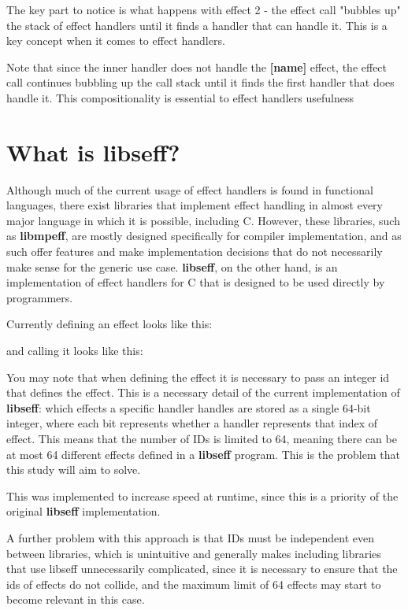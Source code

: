 \documentclass[logo,bsc,singlespacing,parskip,online]{infthesis}
\begin{document}
The key part to notice is what happens with effect 2 - the effect call "bubbles up" the stack of effect handlers until it finds a handler that can handle it. This is a key concept when it comes to effect handlers.

Note that since the inner handler does not handle the \textbf{[name]} effect, the effect call continues bubbling up the call stack until it finds the first handler that does handle it. This compositionality is essential to effect handlers usefulness %







\section{What is libseff?}

Although much of the current usage of effect handlers is found in functional languages, there exist libraries that implement effect handling in almost every major language in which it is possible, including C. However, these libraries, such as \textbf{libmpeff}, are mostly designed specifically for compiler implementation, and as such offer features and make implementation decisions that do not necessarily make sense for the generic use case.\cite{libmprompt} \textbf{libseff}, on the other hand, is an implementation of effect handlers for C that is designed to be used directly by programmers.\cite{libseff_paper}

Currently defining an effect looks like this: %

and calling it looks like this: %

You may note that when defining the effect it is necessary to pass an integer id that defines the effect. This is a necessary detail of the current implementation of \textbf{libseff}: which effects a specific handler handles are stored as a single 64-bit integer, where each bit represents whether a handler represents that index of effect. This means that the number of IDs is limited to 64, meaning there can be at most 64 different  effects defined in a \textbf{libseff} program. This is the problem that this study will aim to solve.

This was implemented to increase speed at runtime, since this is a priority of the original \textbf{libseff} implementation. %

A further problem with this approach is that IDs must be independent even between libraries, which is unintuitive and generally makes including libraries that use libseff unnecessarily complicated, since it is necessary to ensure that the ids of effects do not collide, and the maximum limit of 64 effects may start to become relevant in this case.
\end{document}
